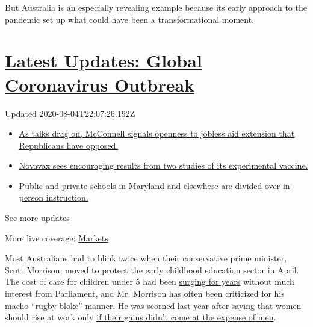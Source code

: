 But Australia is an especially revealing example because its early
approach to the pandemic set up what could have been a transformational
moment.

\hypertarget{latest-updates-global-coronavirus-outbreak}{%
\section{\texorpdfstring{\href{https://www.nytimes3xbfgragh.onion/2020/08/04/world/coronavirus-cases.html?action=click\&pgtype=Article\&state=default\&region=MAIN_CONTENT_1\&context=storylines_live_updates}{Latest
Updates: Global Coronavirus
Outbreak}}{Latest Updates: Global Coronavirus Outbreak}}\label{latest-updates-global-coronavirus-outbreak}}

Updated 2020-08-04T22:07:26.192Z

\begin{itemize}
\tightlist
\item
  \href{https://www.nytimes3xbfgragh.onion/2020/08/04/world/coronavirus-cases.html?action=click\&pgtype=Article\&state=default\&region=MAIN_CONTENT_1\&context=storylines_live_updates\#link-2daa96b5}{As
  talks drag on, McConnell signals openness to jobless aid extension
  that Republicans have opposed.}
\item
  \href{https://www.nytimes3xbfgragh.onion/2020/08/04/world/coronavirus-cases.html?action=click\&pgtype=Article\&state=default\&region=MAIN_CONTENT_1\&context=storylines_live_updates\#link-1228a480}{Novavax
  sees encouraging results from two studies of its experimental
  vaccine.}
\item
  \href{https://www.nytimes3xbfgragh.onion/2020/08/04/world/coronavirus-cases.html?action=click\&pgtype=Article\&state=default\&region=MAIN_CONTENT_1\&context=storylines_live_updates\#link-4825b93}{Public
  and private schools in Maryland and elsewhere are divided over
  in-person instruction.}
\end{itemize}

\href{https://www.nytimes3xbfgragh.onion/2020/08/04/world/coronavirus-cases.html?action=click\&pgtype=Article\&state=default\&region=MAIN_CONTENT_1\&context=storylines_live_updates}{See
more updates}

More live coverage:
\href{https://www.nytimes3xbfgragh.onion/live/2020/08/04/business/stock-market-today-coronavirus?action=click\&pgtype=Article\&state=default\&region=MAIN_CONTENT_1\&context=storylines_live_updates}{Markets}

Most Australians had to blink twice when their conservative prime
minister, Scott Morrison, moved to protect the early childhood education
sector in April. The cost of care for children under 5 had been
\href{https://www.abs.gov.au/ausstats/abs@.nsf/cat/4402.0}{surging for
years} without much interest from Parliament, and Mr. Morrison has often
been criticized for his macho ``rugby bloke'' manner. He was scorned
last year after saying that women should rise at work only
\href{https://www.sbs.com.au/news/scott-morrison-says-the-rise-of-women-should-not-come-at-the-expense-of-men}{if
their gains didn't come at the expense of men}.

